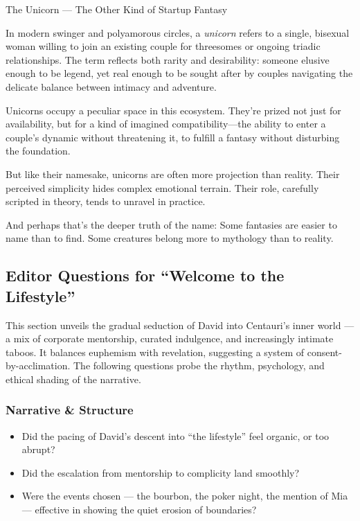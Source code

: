 \begin{HistoricalSidebar}{The Unicorn --- The Other Kind of Startup Fantasy}

  In modern swinger and polyamorous circles, a \textit{unicorn} refers to a single, bisexual woman willing to join an existing 
  couple for threesomes or ongoing triadic relationships. The term reflects both rarity and desirability: someone elusive enough 
  to be legend, yet real enough to be sought after by couples navigating the delicate balance between intimacy and adventure.

  \medskip
  
  Unicorns occupy a peculiar space in this ecosystem. They’re prized not just for availability, but for a kind of imagined 
  compatibility—the ability to enter a couple’s dynamic without threatening it, to fulfill a fantasy without disturbing the 
  foundation.

  \medskip
  
  But like their namesake, unicorns are often more projection than reality. Their perceived simplicity hides complex emotional 
  terrain. Their role, carefully scripted in theory, tends to unravel in practice.

  \medskip
  
  And perhaps that’s the deeper truth of the name:  
  Some fantasies are easier to name than to find.  
  Some creatures belong more to mythology than to reality.
  
\end{HistoricalSidebar}

\medskip


\subsection*{Editor Questions for ``Welcome to the Lifestyle''}

This section unveils the gradual seduction of David into Centauri’s inner world — a mix of corporate mentorship, curated indulgence, and increasingly intimate taboos. It balances euphemism with revelation, suggesting a system of consent-by-acclimation. The following questions probe the rhythm, psychology, and ethical shading of the narrative.

\subsubsection*{Narrative \& Structure}

\begin{itemize}
  \item Did the pacing of David’s descent into ``the lifestyle'' feel organic, or too abrupt?
  \item Did the escalation from mentorship to complicity land smoothly?
  \item Were the events chosen — the bourbon, the poker night, the mention of Mia — effective in showing the quiet erosion of boundaries?
\end{itemize}


